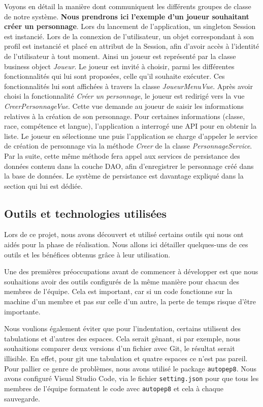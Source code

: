 \documentclass[11pt]{article}
\begin{document}
Voyons en détail la manière dont communiquent les différents groupes de classe de notre système. \textbf{Nous prendrons ici l'exemple d'un joueur souhaitant créer un personnage}. Lors du lancement de l'application, un singleton Session est instancié. Lors de la connexion de l'utilisateur, un objet correspondant à son profil est instancié et placé en attribut de la Session, afin d'avoir accès à l'identité de l'utilisateur à tout moment. Ainsi un joueur est représenté par la classe business object \textit{Joueur}. Le joueur est invité à choisir, parmi les différentes fonctionnalités qui lui sont proposées, celle qu'il souhaite exécuter. Ces fonctionnalités lui sont affichées à travers la classe \textit{JoueurMenuVue}. Après avoir choisi la fonctionnalité \textit{Créer un personnage}, le joueur est redirigé vers la vue \textit{CreerPersonnageVue}. Cette vue demande au joueur de saisir les informations relatives à la création de son personnage. Pour certaines informations (classe, race, compétence et langue), l'application a interrogé une API pour en obtenir la liste. Le joueur en sélectionne une puis l'application se charge d'appeler le service de création de personnage via la méthode \textit{Creer} de la classe \textit{PersonnageService}. Par la suite, cette même méthode fera appel aux services de persistance des données contenu dans la couche DAO, afin d'enregistrer le personnage créé dans la base de données. Le système de persistance est davantage expliqué dans la section qui lui est dédiée.



\subsection{Outils et technologies utilisées}

Lors de ce projet, nous avons découvert et utilisé certains outils qui nous ont aidés pour la phase de réalisation. Nous allons ici détailler quelques-uns de ces outils et les bénéfices obtenus grâce à leur utilisation.

\bigbreak

Une des premières préoccupations avant de commencer à développer est que nous souhaitions avoir des outils configurés de la même manière pour chacun des membres de l'équipe. Cela est important, car si un code fonctionne sur la machine d'un membre et pas sur celle d'un autre, la perte de temps risque d'être importante.


\bigbreak

Nous voulions également éviter que pour l'indentation, certains utilisent des tabulations et d'autres des espaces. Cela serait gênant, si par exemple, nous souhaitions comparer deux versions d'un fichier avec Git, le résultat serait illisible. En effet, pour git une tabulation et quatre espaces ce n'est pas pareil. Pour pallier ce genre de problèmes, nous avons utilisé le package \texttt{autopep8}. Nous avons configuré Visual Studio Code, via le fichier \texttt{setting.json} pour que tous les membres de l'équipe formatent le code avec \texttt{autopep8} et cela à chaque sauvegarde.
\end{document}
